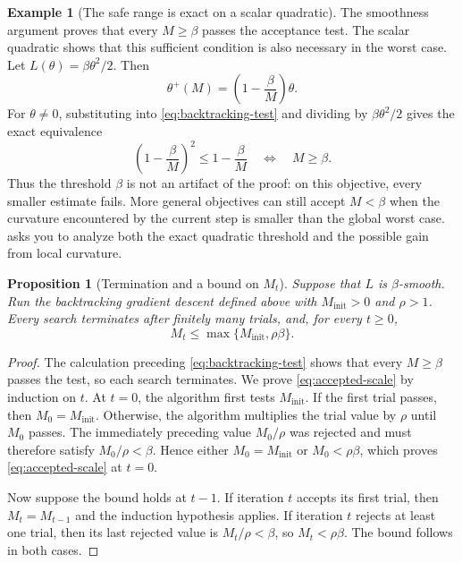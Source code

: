 \documentclass[11pt,twoside]{article}
\newtheorem{proposition}[theorem]{Proposition}
\theoremstyle{definition}
\newtheorem{example}[theorem]{Example}
\theoremstyle{remark}
\begin{document}
\begin{example}[The safe range is exact on a scalar quadratic]
\label{ex:scalar-backtracking}
The smoothness argument proves that every $M\ge\beta$ passes the acceptance
test. The scalar quadratic shows that this sufficient condition is also
necessary in the worst case. Let $L(\theta)=\beta\theta^2/2$. Then
\[
 \theta^+(M)=\left(1-\frac\beta M\right)\theta.
\]
For $\theta\ne0$, substituting into \cref{eq:backtracking-test} and dividing
by $\beta\theta^2/2$ gives the exact equivalence
\begin{equation}
 \left(1-\frac\beta M\right)^2
 \le 1-\frac\beta M
 \quad\Longleftrightarrow\quad
 M\ge\beta.
 \label{eq:scalar-backtracking-threshold}
\end{equation}
Thus the threshold $\beta$ is
not an artifact of the proof: on this objective, every smaller estimate
fails. More general objectives can still accept $M<\beta$ when the curvature
encountered by the current step is smaller than the global worst case.
 asks you to analyze both the exact
quadratic threshold and the possible gain from local curvature.
\end{example}

\begin{proposition}[Termination and a bound on $M_t$]
\label{prop:backtracking-termination}
Suppose that $L$ is $\beta$-smooth. Run the backtracking gradient descent
defined above with $M_{\mathrm{init}}>0$ and $\rho>1$. Every search terminates
after finitely many trials, and, for every $t\ge0$,
\begin{equation}
 M_t\le\max\{M_{\mathrm{init}},\rho\beta\}.
 \label{eq:accepted-scale}
\end{equation}
\end{proposition}

\begin{proof}
The calculation preceding \cref{eq:backtracking-test} shows that every
$M\ge\beta$ passes the test, so each search terminates. We prove
\cref{eq:accepted-scale} by induction on $t$. At $t=0$, the algorithm first
tests $M_{\mathrm{init}}$. If the first trial passes, then
$M_0=M_{\mathrm{init}}$. Otherwise, the algorithm multiplies the trial value
by $\rho$ until $M_0$ passes. The immediately preceding value $M_0/\rho$ was
rejected and must therefore satisfy $M_0/\rho<\beta$. Hence either
$M_0=M_{\mathrm{init}}$ or $M_0<\rho\beta$, which proves
\cref{eq:accepted-scale} at $t=0$.

Now suppose the bound holds at $t-1$. If iteration $t$ accepts its first
trial, then $M_t=M_{t-1}$ and the induction hypothesis applies. If iteration
$t$ rejects at least one trial, then its last rejected value is
$M_t/\rho<\beta$, so $M_t<\rho\beta$. The bound follows in both cases.
\end{proof}
\end{document}

